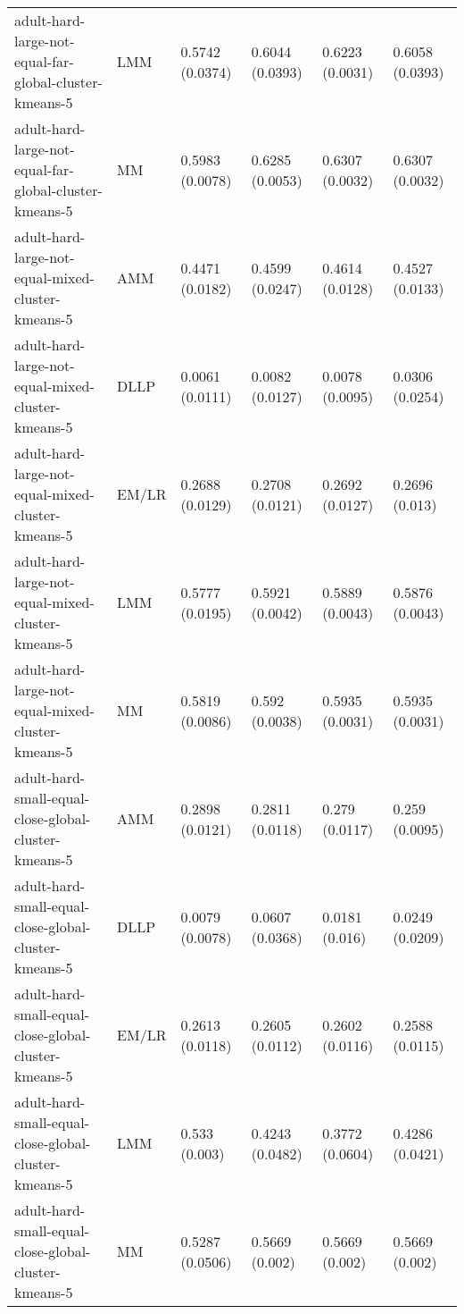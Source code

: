 \begin{tabular}{llllll}
                                 adult-hard-large-not-equal-far-global-cluster-kmeans-5 &       LMM & 0.5742 (0.0374) &  0.6044 (0.0393) &   0.6223 (0.0031) &     0.6058 (0.0393) \\
                                 adult-hard-large-not-equal-far-global-cluster-kmeans-5 &        MM & 0.5983 (0.0078) &  0.6285 (0.0053) &   0.6307 (0.0032) &     0.6307 (0.0032) \\
                                      adult-hard-large-not-equal-mixed-cluster-kmeans-5 &       AMM & 0.4471 (0.0182) &  0.4599 (0.0247) &   0.4614 (0.0128) &     0.4527 (0.0133) \\
                                      adult-hard-large-not-equal-mixed-cluster-kmeans-5 &      DLLP & 0.0061 (0.0111) &  0.0082 (0.0127) &   0.0078 (0.0095) &     0.0306 (0.0254) \\
                                      adult-hard-large-not-equal-mixed-cluster-kmeans-5 &     EM/LR & 0.2688 (0.0129) &  0.2708 (0.0121) &   0.2692 (0.0127) &      0.2696 (0.013) \\
                                      adult-hard-large-not-equal-mixed-cluster-kmeans-5 &       LMM & 0.5777 (0.0195) &  0.5921 (0.0042) &   0.5889 (0.0043) &     0.5876 (0.0043) \\
                                      adult-hard-large-not-equal-mixed-cluster-kmeans-5 &        MM & 0.5819 (0.0086) &   0.592 (0.0038) &   0.5935 (0.0031) &     0.5935 (0.0031) \\
                                   adult-hard-small-equal-close-global-cluster-kmeans-5 &       AMM & 0.2898 (0.0121) &  0.2811 (0.0118) &    0.279 (0.0117) &      0.259 (0.0095) \\
                                   adult-hard-small-equal-close-global-cluster-kmeans-5 &      DLLP & 0.0079 (0.0078) &  0.0607 (0.0368) &    0.0181 (0.016) &     0.0249 (0.0209) \\
                                   adult-hard-small-equal-close-global-cluster-kmeans-5 &     EM/LR & 0.2613 (0.0118) &  0.2605 (0.0112) &   0.2602 (0.0116) &     0.2588 (0.0115) \\
                                   adult-hard-small-equal-close-global-cluster-kmeans-5 &       LMM &   0.533 (0.003) &  0.4243 (0.0482) &   0.3772 (0.0604) &     0.4286 (0.0421) \\
                                   adult-hard-small-equal-close-global-cluster-kmeans-5 &        MM & 0.5287 (0.0506) &   0.5669 (0.002) &    0.5669 (0.002) &      0.5669 (0.002) \\

\end{tabular}
